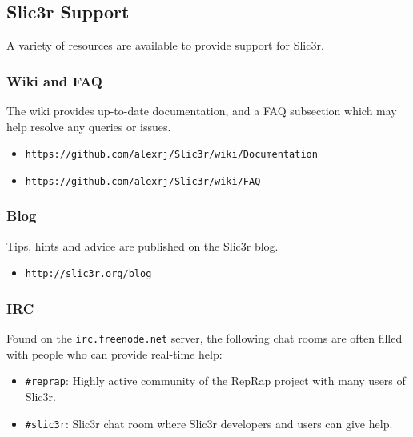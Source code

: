 \subsection{Slic3r Support} %
\label{sec:slic3r_support}


A variety of resources are available to provide support for Slic3r.
\subsubsection{Wiki and FAQ} %
\label{sub:wiki_and_faq}
The wiki provides up-to-date documentation, and a FAQ subsection which may help resolve any queries or issues.
\begin{itemize}
    \item \texttt{https://github.com/alexrj/Slic3r/wiki/Documentation}
    \item \texttt{https://github.com/alexrj/Slic3r/wiki/FAQ}
\end{itemize}

\subsubsection{Blog} %
\label{sub:blog}
Tips, hints and advice are published on the Slic3r blog.
\begin{itemize}
    \item \texttt{http://slic3r.org/blog}
\end{itemize}

\subsubsection{IRC} %
\label{sub:irc}

Found on the \texttt{irc.freenode.net} server, the following chat rooms are often filled with people who can provide real-time help:
\begin{itemize}
\item \texttt{\#reprap}: Highly active community of the RepRap project with many users of Slic3r.
\item \texttt{\#slic3r}: Slic3r chat room where Slic3r developers and users can give help.
\end{itemize}


